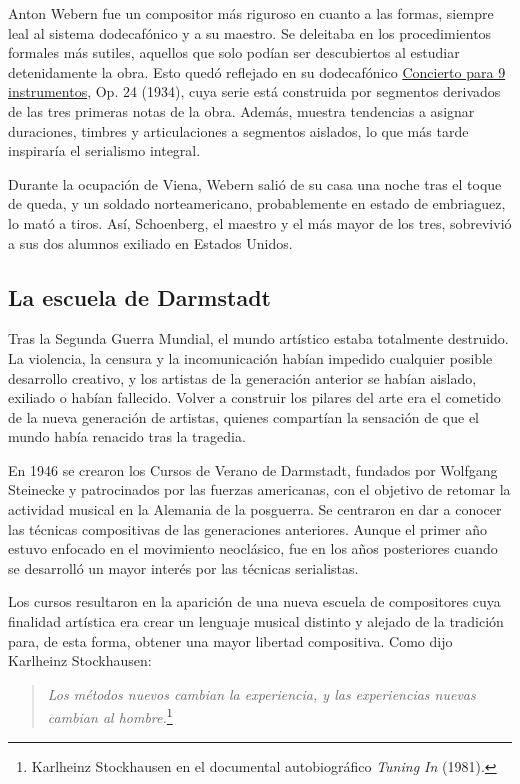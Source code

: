 	Anton Webern fue un compositor más riguroso en cuanto a las formas, siempre leal al sistema dodecafónico y a su maestro. Se deleitaba en los procedimientos formales más sutiles, aquellos que solo podían ser descubiertos al estudiar detenidamente la obra. Esto quedó reflejado en su dodecafónico \href{https://www.youtube.com/watch?v=BqFetTU05wE}{Concierto para 9 instrumentos}, Op. 24 (1934), cuya serie está construida por segmentos derivados de las tres primeras notas de la obra. Además, muestra tendencias a asignar duraciones, timbres y articulaciones a segmentos aislados, lo que más tarde inspiraría el serialismo integral.
        
	Durante la ocupación de Viena, Webern salió de su casa una noche tras el toque de queda, y un soldado norteamericano, probablemente en estado de embriaguez, lo mató a tiros. Así, Schoenberg, el maestro y el más mayor de los tres, sobrevivió a sus dos alumnos exiliado en Estados Unidos.
    
	\subsection{La escuela de Darmstadt}
	Tras la Segunda Guerra Mundial, el mundo artístico estaba totalmente destruido. La violencia, la censura y la incomunicación habían impedido cualquier posible desarrollo creativo, y los artistas de la generación anterior se habían aislado, exiliado o habían fallecido. Volver a construir los pilares del arte era el cometido de la nueva generación de artistas, quienes compartían la sensación de que el mundo había renacido tras la tragedia.
	
	En 1946 se crearon los Cursos de Verano de Darmstadt, fundados por Wolfgang Steinecke y patrocinados por las fuerzas americanas, con el objetivo de retomar la actividad musical en la Alemania de la posguerra. Se centraron en dar a conocer las técnicas compositivas de las generaciones anteriores. Aunque el primer año estuvo enfocado en el movimiento neoclásico, fue en los años posteriores cuando se desarrolló un mayor interés por las técnicas serialistas.
	
	Los cursos resultaron en la aparición de una nueva escuela de compositores cuya finalidad artística era crear un lenguaje musical distinto y alejado de la tradición para, de esta forma, obtener una mayor libertad compositiva. Como dijo Karlheinz Stockhausen:
	
	\begin{quote}
		\textit{Los métodos nuevos cambian la experiencia, y las experiencias nuevas cambian al hombre.}\footnote{Karlheinz Stockhausen en el documental autobiográfico \textit{Tuning In} (1981).}
	\end{quote}
	
